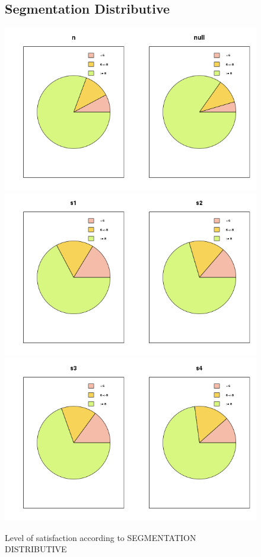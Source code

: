 \documentclass[a4paper, 11pt]{article}
\begin{document}
    \begin{figure}[!ht]
    \subsection{Segmentation Distributive}
    	\centering
            \includegraphics[width = 10 cm]{Remi/Level_of_satisfaction_according_to_SEGMENTATION_DISTRIBUTIVE4.png}
            \includegraphics[width = 10 cm]{Remi/Level_of_satisfaction_according_to_SEGMENTATION_DISTRIBUTIVE6.png}
            \includegraphics[width = 10 cm]{Remi/Level_of_satisfaction_according_to_SEGMENTATION_DISTRIBUTIVE8.png}
            \caption{Level of satisfaction according to SEGMENTATION DISTRIBUTIVE}
            \label{fig:SEGMENTATION_DISTRIBUTIVE8}
    \end{figure}
\end{document}
